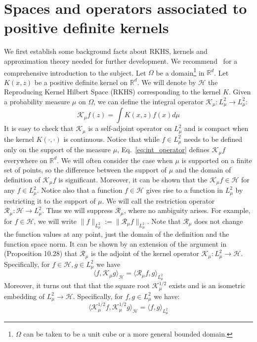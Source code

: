 \documentclass[final,12pt]{colt2018}
\renewcommand{\H}{\mathcal{H}}
\newcommand{\K}{\mathcal{K_\mu}}
\newcommand{\Kh}{\mathcal{K}_\mu^{1/2}}
\newcommand{\I}{\mathcal{R_{\mu}}}
\newcommand{\LL}{{L^2_\mu}}
\newcommand{\R}{\mathbb{R}}
\begin{document}
%
%
%
%
%


\section{Spaces and operators associated to positive definite kernels}
\label{sec:prelim}
We first establish some  background  facts about RKHS, kernels and approximation theory needed for further development. We recommend~\cite{wendland2004scattered} for a comprehensive introduction to the subject.
Let $\Omega$ be a domain\footnote{$\Omega$ can be taken to be a unit cube or a more general bounded domain.} in $\R^d$.    Let $K(x,z)$ be a positive definite kernel on $\R^d$.  We will denote by $\H$ the Reproducing Kernel Hilbert Space (RKHS) corresponding to the kernel $K$.  
Given a probability measure $\mu$  on $\Omega$, we can define the integral operator $\K:\LL \to \LL$: 
\begin{equation}\label{eq:int_operator}
\K f(z)= \int K(x,z)f(x) d\mu
\end{equation}
It is easy to check that $\K$ is a self-adjoint operator on $\LL$ and is compact when the kernel $K(\cdot,\cdot)$ is continuous.  
Notice that while $f \in \LL$ needs to be defined only on the support of the measure $\mu$, Eq.~\ref{eq:int_operator} defines $\K f$  everywhere on $\R^d$. 
We will often consider the case when $\mu$ is supported on a finite set of points, so the difference between the support of $\mu$ and the domain of definition   of $\K f$ is significant. 
Moreover, it can be shown that the $\K f \in \H$ for any $f \in \LL$. Notice also that a function $f \in \H$ gives rise to a function in $\LL$ by restricting it to the support of $\mu$. We will call the restriction operator $\I: \H \to \LL$. 
Thus we will suppress $\I$,  where no ambiguity arises. 
For example, for $f \in \H$, we will write $\|f\|_\LL:=\|\I f\|_\LL$.
Note that $\I$ does not change the function values at any point, just the domain of the definition and the function space norm.  
It can be shown by an extension of the argument in~\cite{wendland2004scattered}  (Proposition 10.28)  that $\I$ is the  adjoint of the kernel operator  $\K:\LL \to \H$. Specifically, for $f \in \H, g\in \LL$ we have
\begin{equation}
\label{eq:adjoint}
\langle f,\K g \rangle_\H = \langle \I f,g\rangle_\LL 
\end{equation}
Moreover, it turns out that  that the square root $\Kh$ exists and is an isometric embedding of $\LL \to \H$. Specifically, for $f,g \in \LL$ we have:
$$
\langle \Kh f,\Kh g \rangle_\H = \langle  f,g\rangle_\LL 
$$
\end{document}
